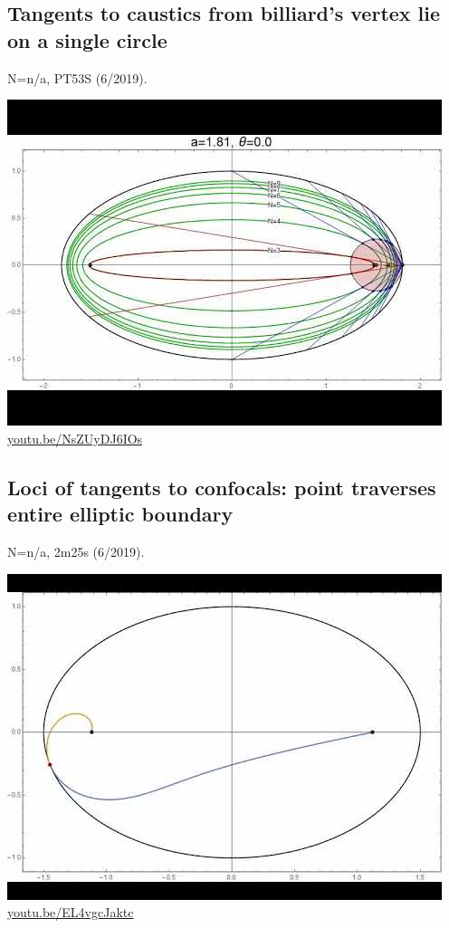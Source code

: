 \documentclass[12pt]{amsart}
\begin{document}
\subsection{Tangents to caustics from billiard's vertex lie on a single circle}
\label{vid:NsZUyDJ6IOs}
\noindent N=n/a, PT53S (6/2019). 
\begin{center}\includegraphics[width=.5\textwidth]{pics/NsZUyDJ6IOs.jpg} \\ 
\href{https://youtu.be/NsZUyDJ6IOs}{\url{youtu.be/NsZUyDJ6IOs}}\end{center}
% 

\subsection{Loci of tangents to confocals: point traverses entire elliptic boundary}
\label{vid:EL4vgcJaktc}
\noindent N=n/a, 2m25s (6/2019). 
\begin{center}\includegraphics[width=.5\textwidth]{pics/EL4vgcJaktc.jpg} \\ 
\href{https://youtu.be/EL4vgcJaktc}{\url{youtu.be/EL4vgcJaktc}}\end{center}
% 
\end{document}
